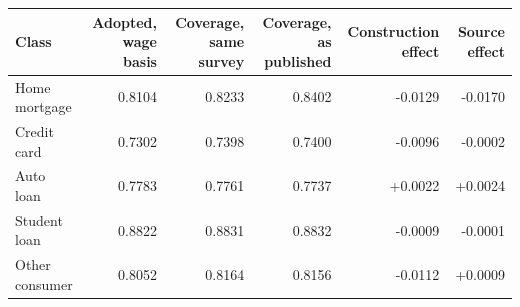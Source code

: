\begin{tabular}{lrrrrr}
\toprule
Class & Adopted, wage basis & Coverage, same survey & Coverage, as published & Construction effect & Source effect \\
\midrule
Home mortgage & 0.8104 & 0.8233 & 0.8402 & -0.0129 & -0.0170 \\
Credit card & 0.7302 & 0.7398 & 0.7400 & -0.0096 & -0.0002 \\
Auto loan & 0.7783 & 0.7761 & 0.7737 & +0.0022 & +0.0024 \\
Student loan & 0.8822 & 0.8831 & 0.8832 & -0.0009 & -0.0001 \\
Other consumer & 0.8052 & 0.8164 & 0.8156 & -0.0112 & +0.0009 \\
\bottomrule
\end{tabular}
